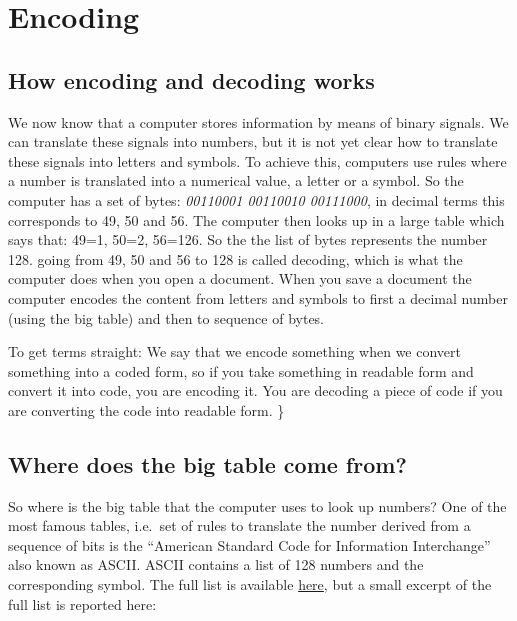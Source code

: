 \documentclass[]{book}
\begin{document}
\hypertarget{encoding}{%
\section{Encoding}\label{encoding}}

\hypertarget{how-encoding-and-decoding-works}{%
\subsection{How encoding and decoding works}\label{how-encoding-and-decoding-works}}

We now know that a computer stores information by means of binary signals. We can translate these signals into numbers, but it is not yet clear how to translate these signals into letters and symbols. To achieve this, computers use rules where a number is translated into a numerical value, a letter or a symbol. So the computer has a set of bytes: \emph{00110001 00110010 00111000}, in decimal terms this corresponds to 49, 50 and 56. The computer then looks up in a large table which says that: 49=1, 50=2, 56=126. So the the list of bytes represents the number 128. going from 49, 50 and 56 to 128 is called decoding, which is what the computer does when you open a document. When you save a document the computer encodes the content from letters and symbols to first a decimal number (using the big table) and then to sequence of bytes.

To get terms straight: We say that we encode something when we convert something into a coded form, so if you take something in readable form and convert it into code, you are encoding it. You are decoding a piece of code if you are converting the code into readable form. \}

\hypertarget{where-does-the-big-table-come-from}{%
\subsection{Where does the big table come from?}\label{where-does-the-big-table-come-from}}

So where is the big table that the computer uses to look up numbers? One of the most famous tables, i.e.~set of rules to translate the number derived from a sequence of bits is the ``American Standard Code for Information Interchange'' also known as ASCII. ASCII contains a list of 128 numbers and the corresponding symbol. The full list is available \href{https://ascii.cl/}{here}, but a small excerpt of the full list is reported here:
\end{document}

